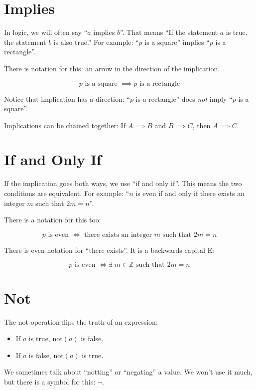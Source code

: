 \section{Implies}

In logic, we will often say ``$a$ implies $b$''.  That means ``If the
statement $a$ is true, the statement $b$ is also true.''  For example:
``$p$ is a square'' implies ``$p$ is a rectangle''.

There is notation for this: an arrow in the direction of the implication.

$$p \text{ is a square } \implies p \text{ is a rectangle}$$

Notice that implication has a direction: ``$p$ is a rectangle'' does \textit{not} imply 
``$p$ is a square''.

Implications can be chained together: If $A \implies B$ and $B \implies C$,  then $A \implies C$.

\section {If and Only If}

If the implication goes both ways, we use ``if and only if''.  This
means the two conditions are equivalent.  For example: ``$n$ is even
if and only if there exists an integer $m$ such that $2m = n$''. 

There is a notation for this too:

$$p \text{ is even } \iff \text{ there exists an integer } m \text{ such that } 2m = n$$

There is even notation for ``there exists''. It is a backwards capital E:

$$p \text{ is even } \iff \exists \; m \in \mathbb{Z}  \text{ such that } 2m = n$$

\section {Not}

The not operation flips the truth of an expression:
\begin{itemize}
\item If $a$ is true, $\text{not}(a)$ is false.

\item If $a$ is false, $\text{not}(a)$ is true.
\end{itemize}

We sometimes talk about ``notting'' or ``negating'' a value.  We won't
use it much, but there is a symbol for this: $\neg$.

